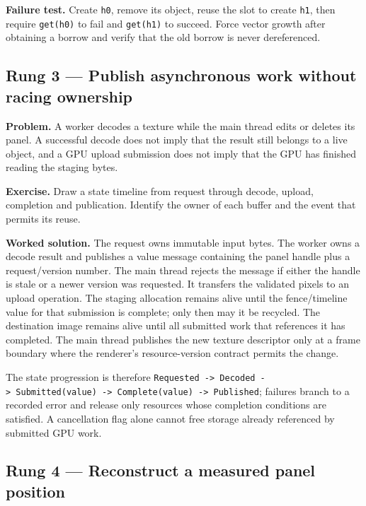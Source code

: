 \textbf{Failure test.} Create \texttt{h0}, remove its object, reuse the slot to create \texttt{h1}, then require \texttt{get(h0)} to fail and \texttt{get(h1)} to succeed. Force vector growth after obtaining a borrow and verify that the old borrow is never dereferenced.

\subsection{Rung 3 --- Publish asynchronous work without racing ownership}\label{02-foundations-ii-ch038-rung-3-publish-asynchronous-work-without-racing-ownership}

\textbf{Problem.} A worker decodes a texture while the main thread edits or deletes its panel. A successful decode does not imply that the result still belongs to a live object, and a GPU upload submission does not imply that the GPU has finished reading the staging bytes.

\textbf{Exercise.} Draw a state timeline from request through decode, upload, completion and publication. Identify the owner of each buffer and the event that permits its reuse.

\textbf{Worked solution.} The request owns immutable input bytes. The worker owns a decode result and publishes a value message containing the panel handle plus a request/version number. The main thread rejects the message if either the handle is stale or a newer version was requested. It transfers the validated pixels to an upload operation. The staging allocation remains alive until the fence/timeline value for that submission is complete; only then may it be recycled. The destination image remains alive until all submitted work that references it has completed. The main thread publishes the new texture descriptor only at a frame boundary where the renderer's resource-version contract permits the change.

The state progression is therefore \texttt{Requested\ -\textgreater{}\ Decoded\ -\textgreater{}\ Submitted(value)\ -\textgreater{}\ Complete(value)\ -\textgreater{}\ Published}; failures branch to a recorded error and release only resources whose completion conditions are satisfied. A cancellation flag alone cannot free storage already referenced by submitted GPU work.

\subsection{Rung 4 --- Reconstruct a measured panel position}\label{02-foundations-ii-ch038-rung-4-reconstruct-a-measured-panel-position}

